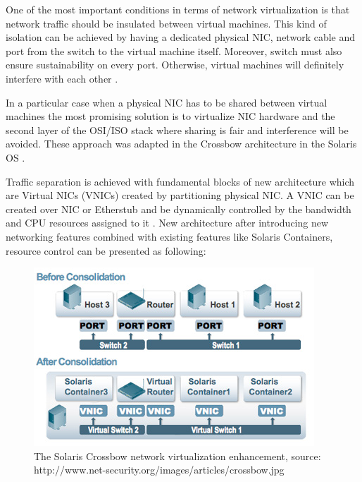 \documentclass[11pt]{book}
\begin{document}
        One of the most important conditions in terms of network virtualization is that network traffic should be
        insulated between virtual machines. This kind of isolation can be achieved by having a dedicated physical NIC,
        network cable and port from the switch to the virtual machine itself. Moreover, switch must also ensure
        sustainability on every port. Otherwise, virtual machines will definitely interfere with each other \cite{crossbow}.
        
        In a particular case when a physical NIC has to be shared between virtual machines the most promising solution is
        to virtualize NIC hardware and the second layer of the OSI/ISO stack where sharing is fair and interference
        will be avoided. These approach was adapted in the Crossbow architecture in the Solaris OS \cite{crossbow}.
        
        Traffic separation is achieved with fundamental blocks of new architecture which are Virtual NICs (VNICs)
        created by partitioning physical NIC. A VNIC can be created over NIC or Etherstub and
        be dynamically controlled by the bandwidth and CPU resources assigned to it
        \cite{crossbow,network_virtualization}. New architecture after introducing new networking features combined with
        existing features like Solaris Containers, resource control can be presented as following:

        \begin{figure}[H]
          \begin{center}
            \includegraphics[width=.7\textwidth]{img/crossbow.jpg}
          \end{center}

          \caption{The Solaris Crossbow network virtualization enhancement, source: http://www.net-security.org/images/articles/crossbow.jpg}
        \end{figure}
\end{document}
